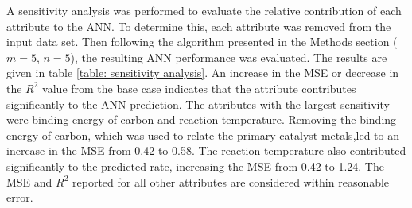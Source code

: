 A sensitivity analysis was performed to evaluate the relative contribution of each attribute to the ANN. To determine this, each attribute was removed from the input data set. Then following the algorithm presented in the Methods section ($m=5$, $n=5$), the resulting ANN performance was evaluated. The results are given in table \ref{table: sensitivity analysis}. An increase in the MSE or decrease in the $R^2$ value from the base case indicates that the attribute contributes significantly to the ANN prediction. The attributes with the largest sensitivity were binding energy of carbon and reaction temperature. Removing the binding energy of carbon, which was used to relate the primary catalyst metals,led to an increase in the MSE from 0.42 to 0.58. The reaction temperature also contributed significantly to the predicted rate, increasing the MSE from 0.42 to 1.24. The MSE and $R^2$ reported for all other attributes are considered within reasonable error. 

